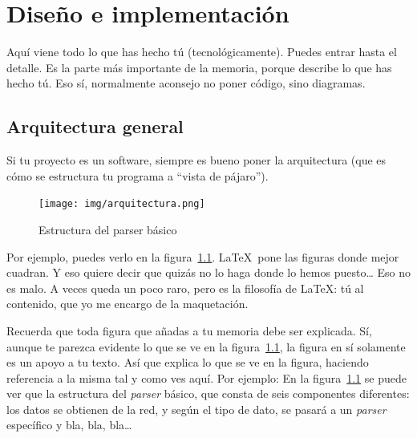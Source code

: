\documentclass[a4paper, 12pt]{book}
\begin{document}

\cleardoublepage
\chapter{Diseño e implementación}
\label{sec:diseno}

Aquí viene todo lo que has hecho tú (tecnológicamente). 
Puedes entrar hasta el detalle. 
Es la parte más importante de la memoria, porque describe lo que has hecho tú.
Eso sí, normalmente aconsejo no poner código, sino diagramas.



\section{Arquitectura general} 
\label{sec:arquitectura}

Si tu proyecto es un software, siempre es bueno poner la arquitectura (que es cómo se estructura tu programa a ``vista de pájaro'').

\begin{figure}
  \centering
  \texttt{[image: img/arquitectura.png]}
  \caption{Estructura del parser básico}
  \label{fig:arquitectura}
\end{figure}


Por ejemplo, puedes verlo en la figura~\ref{fig:arquitectura}.
\LaTeX \ pone las figuras donde mejor cuadran. 
Y eso quiere decir que quizás no lo haga donde lo hemos puesto\ldots 
Eso no es malo.
A veces queda un poco raro, pero es la filosofía de \LaTeX: tú al contenido, que yo me encargo de la maquetación.


 
Recuerda que toda figura que añadas a tu memoria debe ser explicada.
Sí, aunque te parezca evidente lo que se ve en la figura~\ref{fig:arquitectura}, la figura en sí solamente es un apoyo a tu texto.
Así que explica lo que se ve en la figura, haciendo referencia a la misma tal y como ves aquí.
Por ejemplo: En la figura~\ref{fig:arquitectura} se puede ver que la estructura del \emph{parser} básico, que consta de seis componentes diferentes: los datos se obtienen de la red, y según el tipo de dato, se pasará a un \emph{parser} específico y bla, bla, bla\ldots
\end{document}
